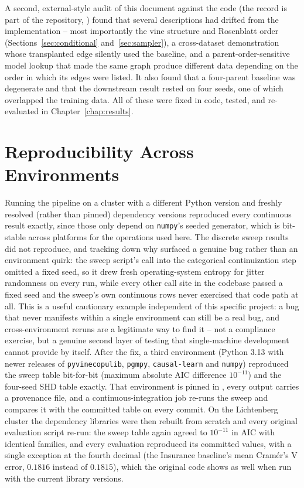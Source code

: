 \documentclass[
  english,
  class=report,
  accentcolor=2c,
  marginpar=false,
  parskip=half-,
  fontsize=11pt,
  ruledheaders=false,
  pdfa=false,
  IMRAD=false,
  thesis={type=master}
]{tudapub}
\begin{document}
A second, external-style audit of this document against the code (the
record is part of the repository, ) found that several
descriptions had drifted from the implementation -- most importantly the
vine structure and Rosenblatt order (Sections~\ref{sec:conditional}
and~\ref{sec:sampler}), a cross-dataset demonstration whose transplanted
edge silently used the baseline, and a parent-order-sensitive model lookup
that made the same graph produce different data depending on the order in
which its edges were listed. It also found that a four-parent baseline was
degenerate and that the downstream result rested on four seeds, one of
which overlapped the training data. All of these were fixed in code, tested,
and re-evaluated in Chapter~\ref{chap:results}.

\section{Reproducibility Across Environments}
Running the pipeline on a cluster with a different Python version and
freshly resolved (rather than pinned) dependency versions reproduced every
continuous result exactly, since those only depend on \texttt{numpy}'s
seeded generator, which is bit-stable across platforms for the operations
used here. The discrete sweep results did not reproduce, and tracking down
why surfaced a genuine bug rather than an environment quirk: the sweep
script's call into the categorical continuization step omitted a fixed
seed, so it drew fresh operating-system entropy for jitter randomness on
every run, while every other call site in the codebase passed a fixed seed
and the sweep's own continuous rows never exercised that code path at all.
This is a useful cautionary example independent of this specific project:
a bug that never manifests within a single environment can still be a real
bug, and cross-environment reruns are a legitimate way to find it -- not a
compliance exercise, but a genuine second layer of testing that single-machine
development cannot provide by itself. After the fix, a third environment
(Python 3.13 with newer releases of \texttt{pyvinecopulib},
\texttt{pgmpy}, \texttt{causal-learn} and \texttt{numpy}) reproduced the
sweep table bit-for-bit (maximum absolute AIC difference $10^{-11}$) and the
four-seed SHD table exactly. That environment is pinned in
, every output carries a provenance file, and a
continuous-integration job re-runs the sweep and compares it with the
committed table on every commit. On the Lichtenberg cluster the
dependency libraries were then rebuilt from scratch and every original
evaluation script re-run: the sweep table again agreed to $10^{-11}$ in AIC
with identical families, and every evaluation reproduced its committed
values, with a single exception at the fourth decimal (the Insurance
baseline's mean Cram\'er's V error, $0.1816$ instead of $0.1815$), which
the original code shows as well when run with the current library
versions.
\end{document}
